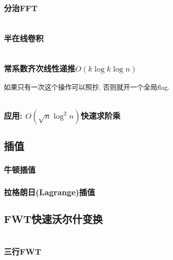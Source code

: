 \documentclass[a4paper, twoside]{article}
\begin{document}
\begin{multicols}{2}
				\subsubsection{分治FFT}
					\inputminted{cpp}{../src/math/分治FFT.cpp}

				\subsubsection{半在线卷积}
					\inputminted{cpp}{../src/math/半在线卷积.cpp}
				
				\subsubsection{常系数齐次线性递推$O(k\log k\log n)$}
					\label{LinearRecurrence}
					如果只有一次这个操作可以照抄, 否则就开一个全局flag.
					\inputminted{cpp}{../src/math/常系数齐次线性递推.cpp}
				
				\subsubsection{应用: $O(\sqrt n \log^2 n)$快速求阶乘}
					\label{fastfact}
					

			\subsection{插值}
				\subsubsection{牛顿插值}
					

				\subsubsection{拉格朗日(Lagrange)插值}
					
				

			\subsection{FWT快速沃尔什变换}
				\inputminted{cpp}{../src/math/FWT.cpp}

				\subsubsection{三行FWT}
					\inputminted{cpp}{../src/math/fwt3.cpp}


\end{multicols}
\end{document}
